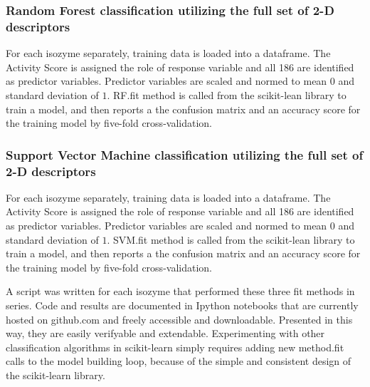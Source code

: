 \subsubsection{Random Forest classification utilizing the full set of 2-D descriptors}
For each isozyme separately, training data is loaded into a dataframe. The Activity Score is assigned the role of response variable and all 186 are identified as predictor variables. Predictor variables are scaled and normed to mean $0$ and standard deviation of $1$. RF.fit method is called from the scikit-lean library to train a model, and then reports a the confusion matrix and an accuracy score for the training model by five-fold cross-validation.

\subsubsection{Support Vector Machine classification utilizing the full set of 2-D descriptors}
For each isozyme separately, training data is loaded into a dataframe. The Activity Score is assigned the role of response variable and all 186 are identified as predictor variables. Predictor variables are scaled and normed to mean $0$ and standard deviation of $1$. SVM.fit method is called from the scikit-lean library to train a model, and then reports a the confusion matrix and an accuracy score for the training model by five-fold cross-validation.

A script was written for each isozyme that performed these three fit methods in series. Code and results are documented in Ipython notebooks that are currently hosted on github.com and freely accessible and downloadable. Presented in this way, they are easily verifyable and extendable. Experimenting with other classification algorithms in scikit-learn simply requires adding new method.fit calls to the model building loop, because of the simple and consistent design of the scikit-learn library.
